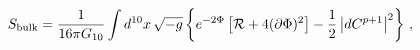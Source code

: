 \begin{equation}\label{bulk_action}
S_{{\rm{bulk}}}={\frac{1}{1 6\pi G_{1 0}}} \int d^{1
0}x\,\sqrt{-g}\left\{ e^{-2\Phi}\left[{\cal
R}+4(\partial\Phi)^{2}\right]
-{\frac{1}{2}}\left|dC^{p+1}\right|^{2} \right\} \, ,
\end{equation}

